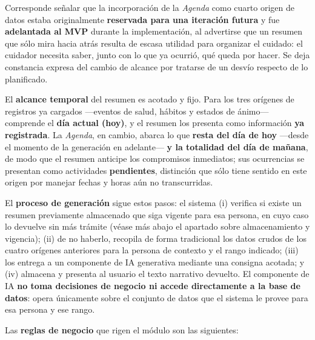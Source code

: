 \documentclass[a4paper,12pt]{article}
\begin{document}
    \par Corresponde señalar que la incorporación de la \textit{Agenda} como cuarto origen de datos estaba originalmente \textbf{reservada para una iteración futura} y fue \textbf{adelantada al MVP} durante la implementación, al advertirse que un resumen que sólo mira hacia atrás resulta de escasa utilidad para organizar el cuidado: el cuidador necesita saber, junto con lo que ya ocurrió, qué queda por hacer. Se deja constancia expresa del cambio de alcance por tratarse de un desvío respecto de lo planificado.
    \par El \textbf{alcance temporal} del resumen es acotado y fijo. Para los tres orígenes de registros ya cargados —eventos de salud, hábitos y estados de ánimo— comprende el \textbf{día actual (hoy)}, y el resumen los presenta como información \textbf{ya registrada}. La \textit{Agenda}, en cambio, abarca lo que \textbf{resta del día de hoy} —desde el momento de la generación en adelante— \textbf{y la totalidad del día de mañana}, de modo que el resumen anticipe los compromisos inmediatos; sus ocurrencias se presentan como actividades \textbf{pendientes}, distinción que sólo tiene sentido en este origen por manejar fechas y horas aún no transcurridas.
    \par El \textbf{proceso de generación} sigue estos pasos: el sistema (i) verifica si existe un resumen previamente almacenado que siga vigente para esa persona, en cuyo caso lo devuelve sin más trámite (véase más abajo el apartado sobre almacenamiento y vigencia); (ii) de no haberlo, recopila de forma tradicional los datos crudos de los cuatro orígenes anteriores para la persona de contexto y el rango indicado; (iii) los entrega a un componente de IA generativa mediante una consigna acotada; y (iv) almacena y presenta al usuario el texto narrativo devuelto. El componente de IA \textbf{no toma decisiones de negocio ni accede directamente a la base de datos}: opera únicamente sobre el conjunto de datos que el sistema le provee para esa persona y ese rango.
    \par Las \textbf{reglas de negocio} que rigen el módulo son las siguientes:
\end{document}
